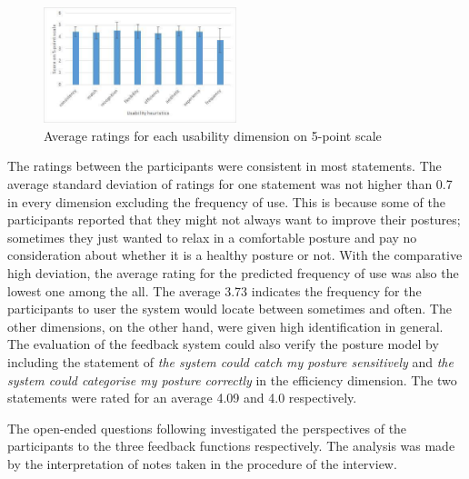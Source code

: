 \begin{figure}[h]
\centering
  \includegraphics[width=0.5\textwidth]{figs/usability_evaluation}
\caption{Average ratings for each usability dimension on 5-point scale}
\label{fig:usability_ratings}
\end{figure}

The ratings between the participants were consistent in most statements. The average standard deviation of ratings for one statement was not higher than 0.7 in every dimension excluding the frequency of use. This is because some of the participants reported that they might not always want to improve their postures; sometimes they just wanted to relax in a comfortable posture and pay no consideration about whether it is a healthy posture or not. With the comparative high deviation, the average rating for the predicted frequency of use was also the lowest one among the all. The average 3.73 indicates the frequency for the participants to user the system would locate between sometimes and often. The other dimensions, on the other hand, were given high identification in general. The evaluation of the feedback system could also verify the posture model by including the statement of \textit{the system could catch my posture sensitively} and \textit{the system could categorise my posture correctly} in the efficiency dimension. The two statements were rated for an average 4.09 and 4.0 respectively.

The open-ended questions following investigated the perspectives of the participants to the three feedback functions respectively. The analysis was made by the interpretation of notes taken in the procedure of the interview.

